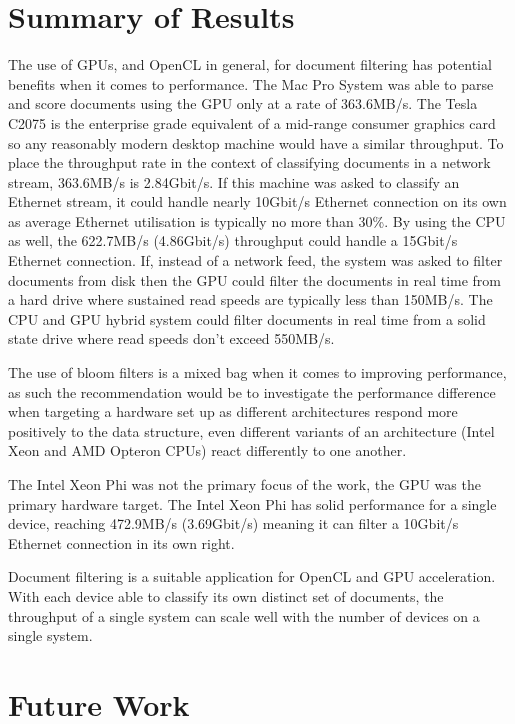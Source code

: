 \section{Summary of Results}

The use of GPUs, and OpenCL in general, for document filtering has potential
benefits when it comes to performance. The Mac Pro System was able to parse and
score documents using the GPU only at a rate of 363.6MB/s. The Tesla C2075 is
the enterprise grade equivalent of a mid-range consumer graphics card so any
reasonably modern desktop machine would have a similar throughput. To place the
throughput rate in the context of classifying documents in a network stream,
363.6MB/s is 2.84Gbit/s. If this machine was asked to classify an Ethernet
stream, it could handle nearly 10Gbit/s Ethernet connection on its own as
average Ethernet utilisation is typically no more than 30\%. By using the CPU as
well, the 622.7MB/s (4.86Gbit/s) throughput could handle a 15Gbit/s Ethernet
connection. If, instead of a network feed, the system was asked to filter
documents from disk then the GPU could filter the documents in real time from a
hard drive where sustained read speeds are typically less than 150MB/s. The CPU
and GPU hybrid system could filter documents in real time from a solid state
drive where read speeds don't exceed 550MB/s.

The use of bloom filters is a mixed bag when it comes to improving performance,
as such the recommendation would be to investigate the performance difference
when targeting a hardware set up as different architectures respond more
positively to the data structure, even different variants of an architecture
(Intel Xeon and AMD Opteron CPUs) react differently to one another.

The Intel Xeon Phi was not the primary focus of the work, the GPU was the
primary hardware target. The Intel Xeon Phi has solid performance for a single
device, reaching 472.9MB/s (3.69Gbit/s) meaning it can filter a 10Gbit/s
Ethernet connection in its own right.

Document filtering is a suitable application for OpenCL and GPU acceleration.
With each device able to classify its own distinct set of documents, the
throughput of a single system can scale well with the number of devices on a
single system.

\section{Future Work}

